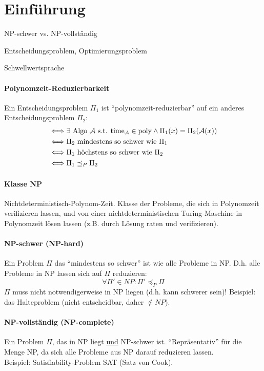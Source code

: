 \section{Einführung}

\begin{takeaway}
    \item NP-schwer vs. NP-vollständig
    \item Entscheidungsproblem, Optimierungsproblem
    \item Schwellwertsprache
\end{takeaway}

\paragraph{Polynomzeit-Reduzierbarkeit}
Ein Entscheidungsproblem $\Pi_1$ ist ``polynomzeit-reduzierbar'' auf ein anderes Entscheidungsproblem $\Pi_2$:
\begin{align*}
& \Longleftrightarrow
\exists \text{ Algo } \mathcal{A} \text{ s.t. } \text{time}_{\mathcal{A}} \in \text{poly}
\wedge \Pi_1(x) = \Pi_2(\mathcal{A}(x))
\\
& \Longleftrightarrow
\Pi_2 \text{ mindestens so schwer wie } \Pi_1
\\
& \Longleftrightarrow
\Pi_1 \text{ höchstens so schwer wie } \Pi_2
\\
& \Longleftrightarrow
\Pi_1 \preceq_P \Pi_2
\end{align*}

\paragraph{Klasse NP}
Nichtdeterministisch-Polynom-Zeit.
Klasse der Probleme, die sich in Polynomzeit verifizieren lassen, und von einer nichtdeterministischen
Turing-Maschine in Polynomzeit lösen lassen (z.B. durch Lösung raten und verifizieren).

\paragraph{NP-schwer (NP-hard)}
Ein Problem $\Pi$ das ``mindestens so schwer'' ist wie alle Probleme in NP.
D.h. alle Probleme in NP lassen sich auf $\Pi$ reduzieren:
$$ \forall \Pi' \in NP : \Pi' \preceq_P \Pi $$
$\Pi$ muss nicht notwendigerweise in NP liegen (d.h. kann schwerer sein)!
Beispiel: das Halteproblem (nicht entscheidbar, daher $\notin NP$).

\paragraph{NP-vollständig (NP-complete)}
Ein Problem $\Pi$, das in NP liegt \underline{und} NP-schwer ist.
``Repräsentativ'' für die Menge NP, da sich alle Probleme aus NP darauf reduzieren lassen. \\
Beispiel: Satisfiability-Problem SAT (Satz von Cook).

